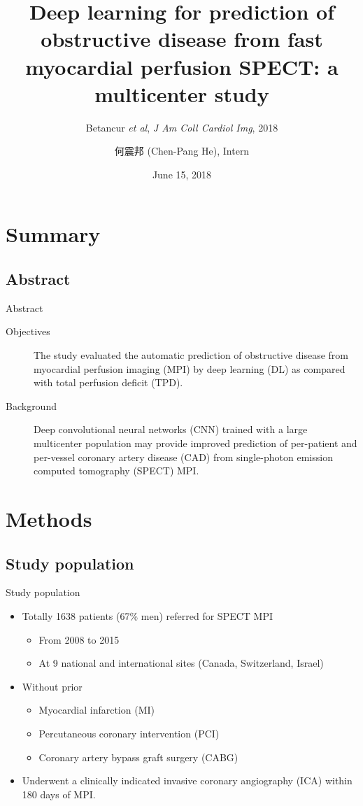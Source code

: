 \documentclass{beamer}
\title[Deep learning (Betancur \textit{et al}, 2018)]{Deep learning for prediction of obstructive disease from fast myocardial perfusion SPECT: a multicenter study}
\subtitle{Betancur \textit{et al}, \textit{J Am Coll Cardiol Img}, 2018}
\author[Chen-Pang He]{何震邦 (Chen-Pang He), Intern}
\date{June 15, 2018}
\institute[CGH]{Cathay General Hospital}
\begin{document}
\maketitle

\section{Summary}
\subsection{Abstract}
\begin{frame}{Abstract}
    \begin{description}
        \item[Objectives] 
            The study evaluated the automatic prediction of obstructive disease
            from myocardial perfusion imaging (MPI) by deep learning (DL) as
            compared with total perfusion deficit (TPD).
        \item[Background]
            Deep convolutional neural networks (CNN) trained with a large
            multicenter population may provide improved prediction of
            per-patient and per-vessel coronary artery disease (CAD) from
            single-photon emission computed tomography (SPECT) MPI.
    \end{description}
\end{frame}

\section{Methods}
\subsection{Study population}
\begin{frame}{Study population}
    \begin{itemize}
        \item Totally 1638 patients (67\% men) referred for SPECT MPI
            \begin{itemize}
                \item From 2008 to 2015
                \item At 9 national and international sites (Canada, Switzerland, Israel)
            \end{itemize}
        \item Without prior
            \begin{itemize}
                \item Myocardial infarction (MI)
                \item Percutaneous coronary intervention (PCI)
                \item Coronary artery bypass graft surgery (CABG)
            \end{itemize}
        \item Underwent a clinically indicated invasive coronary angiography
            (ICA) within 180 days of MPI.
    \end{itemize}
\end{frame}
\end{document}
